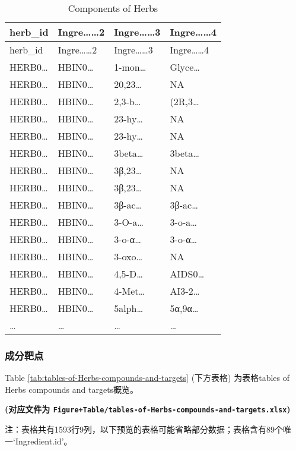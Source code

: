 \documentclass[
]{article}
\begin{document}
\begin{longtable}[]{@{}llll@{}}
\caption{\label{tab:Components-of-Herbs}Components of Herbs}\tabularnewline
\toprule
herb\_id & Ingre\ldots\ldots2 & Ingre\ldots\ldots3 & Ingre\ldots\ldots4\tabularnewline
\midrule
\endfirsthead
\toprule
herb\_id & Ingre\ldots\ldots2 & Ingre\ldots\ldots3 & Ingre\ldots\ldots4\tabularnewline
\midrule
\endhead
HERB0\ldots{} & HBIN0\ldots{} & 1-mon\ldots{} & Glyce\ldots{}\tabularnewline
HERB0\ldots{} & HBIN0\ldots{} & 20,23\ldots{} & NA\tabularnewline
HERB0\ldots{} & HBIN0\ldots{} & 2,3-b\ldots{} & (2R,3\ldots{}\tabularnewline
HERB0\ldots{} & HBIN0\ldots{} & 23-hy\ldots{} & NA\tabularnewline
HERB0\ldots{} & HBIN0\ldots{} & 23-hy\ldots{} & NA\tabularnewline
HERB0\ldots{} & HBIN0\ldots{} & 3beta\ldots{} & 3beta\ldots{}\tabularnewline
HERB0\ldots{} & HBIN0\ldots{} & 3β,23\ldots{} & NA\tabularnewline
HERB0\ldots{} & HBIN0\ldots{} & 3β,23\ldots{} & NA\tabularnewline
HERB0\ldots{} & HBIN0\ldots{} & 3β-ac\ldots{} & 3β-ac\ldots{}\tabularnewline
HERB0\ldots{} & HBIN0\ldots{} & 3-O-a\ldots{} & 3-o-a\ldots{}\tabularnewline
HERB0\ldots{} & HBIN0\ldots{} & 3-o-α\ldots{} & 3-o-α\ldots{}\tabularnewline
HERB0\ldots{} & HBIN0\ldots{} & 3-oxo\ldots{} & NA\tabularnewline
HERB0\ldots{} & HBIN0\ldots{} & 4,5-D\ldots{} & AIDS0\ldots{}\tabularnewline
HERB0\ldots{} & HBIN0\ldots{} & 4-Met\ldots{} & AI3-2\ldots{}\tabularnewline
HERB0\ldots{} & HBIN0\ldots{} & 5alph\ldots{} & 5α,9α\ldots{}\tabularnewline
\ldots{} & \ldots{} & \ldots{} & \ldots{}\tabularnewline
\bottomrule
\end{longtable}

\hypertarget{ux6210ux5206ux9776ux70b9}{%
\subsubsection{成分靶点}\label{ux6210ux5206ux9776ux70b9}}

Table \ref{tab:tables-of-Herbs-compounds-and-targets} (下方表格) 为表格tables of Herbs compounds and targets概览。

\textbf{(对应文件为 \texttt{Figure+Table/tables-of-Herbs-compounds-and-targets.xlsx})}

\begin{center}\begin{tcolorbox}[colback=gray!10, colframe=gray!50, width=0.9\linewidth, arc=1mm, boxrule=0.5pt]注：表格共有1593行9列，以下预览的表格可能省略部分数据；表格含有89个唯一`Ingredient.id'。
\end{tcolorbox}
\end{center}
\end{document}
